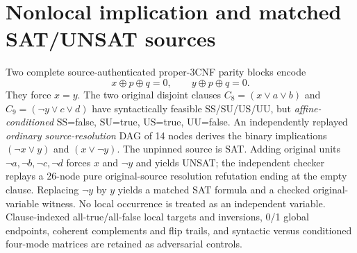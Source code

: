 \documentclass[11pt]{article}
\begin{document}
\section{Nonlocal implication and matched SAT/UNSAT sources}
Two complete source-authenticated proper-3CNF parity blocks encode
\[
x\oplus p\oplus q=0,\qquad y\oplus p\oplus q=0.
\]
They force $x=y$. The two original disjoint clauses $C_8=(x\vee a\vee b)$ and $C_9=(\neg y\vee c\vee d)$ have syntactically feasible SS/SU/US/UU, but \emph{affine-conditioned} SS=false, SU=true, US=true, UU=false. An independently replayed \emph{ordinary source-resolution} DAG of 14 nodes derives the binary implications $(\neg x\vee y)$ and $(x\vee\neg y)$. The unpinned source is SAT. Adding original units $\neg a,\neg b,\neg c,\neg d$ forces $x$ and $\neg y$ and yields UNSAT; the independent checker replays a 26-node pure original-source resolution refutation ending at the empty clause. Replacing $\neg y$ by $y$ yields a matched SAT formula and a checked original-variable witness. No local occurrence is treated as an independent variable. Clause-indexed all-true/all-false local targets and inversions, 0/1 global endpoints, coherent complements and flip trails, and syntactic versus conditioned four-mode matrices are retained as adversarial controls.
\end{document}

